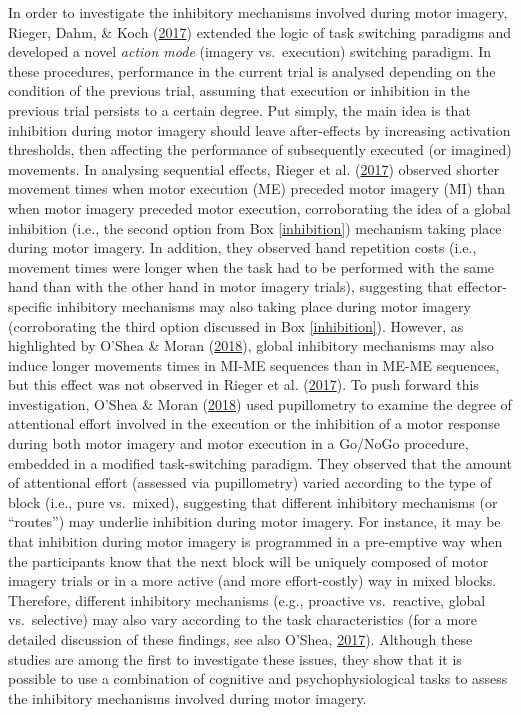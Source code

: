 \documentclass[a4paper,12pt,twoside,onecolumn,openright,final,oldfontcommands]{memoir}
\begin{document}
In order to investigate the inhibitory mechanisms involved during motor imagery, Rieger, Dahm, \& Koch (\protect\hyperlink{ref-rieger_inhibition_2017}{2017}) extended the logic of task switching paradigms and developed a novel \emph{action mode} (imagery vs.~execution) switching paradigm. In these procedures, performance in the current trial is analysed depending on the condition of the previous trial, assuming that execution or inhibition in the previous trial persists to a certain degree. Put simply, the main idea is that inhibition during motor imagery should leave after-effects by increasing activation thresholds, then affecting the performance of subsequently executed (or imagined) movements. In analysing sequential effects, Rieger et al. (\protect\hyperlink{ref-rieger_inhibition_2017}{2017}) observed shorter movement times when motor execution (ME) preceded motor imagery (MI) than when motor imagery preceded motor execution, corroborating the idea of a global inhibition (i.e., the second option from Box \ref{inhibition}) mechanism taking place during motor imagery. In addition, they observed hand repetition costs (i.e., movement times were longer when the task had to be performed with the same hand than with the other hand in motor imagery trials), suggesting that effector-specific inhibitory mechanisms may also taking place during motor imagery (corroborating the third option discussed in Box \ref{inhibition}). However, as highlighted by O'Shea \& Moran (\protect\hyperlink{ref-oshea_go_2018}{2018}), global inhibitory mechanisms may also induce longer movements times in MI-ME sequences than in ME-ME sequences, but this effect was not observed in Rieger et al. (\protect\hyperlink{ref-rieger_inhibition_2017}{2017}). To push forward this investigation, O'Shea \& Moran (\protect\hyperlink{ref-oshea_go_2018}{2018}) used pupillometry to examine the degree of attentional effort involved in the execution or the inhibition of a motor response during both motor imagery and motor execution in a Go/NoGo procedure, embedded in a modified task-switching paradigm. They observed that the amount of attentional effort (assessed via pupillometry) varied according to the type of block (i.e., pure vs.~mixed), suggesting that different inhibitory mechanisms (or \enquote{routes}) may underlie inhibition during motor imagery. For instance, it may be that inhibition during motor imagery is programmed in a pre-emptive way when the participants know that the next block will be uniquely composed of motor imagery trials or in a more active (and more effort-costly) way in mixed blocks. Therefore, different inhibitory mechanisms (e.g., proactive vs.~reactive, global vs.~selective) may also vary according to the task characteristics (for a more detailed discussion of these findings, see also O'Shea, \protect\hyperlink{ref-oshea_investigation_2017}{2017}). Although these studies are among the first to investigate these issues, they show that it is possible to use a combination of cognitive and psychophysiological tasks to assess the inhibitory mechanisms involved during motor imagery.
\end{document}
